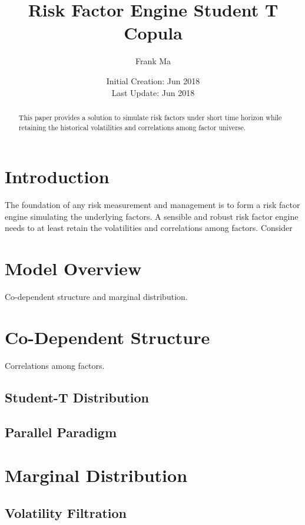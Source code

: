 \documentclass{article}
\title{Risk Factor Engine Student T Copula}
\author{Frank Ma}
\date{Initial Creation: Jun 2018 \\ Last Update: Jun 2018}
\begin{document}
\maketitle


\begin{abstract}
    This paper provides a solution to simulate risk factors under short time horizon while retaining the historical volatilities and correlations among factor universe.
\end{abstract}

\section{Introduction}
The foundation of any risk measurement and management is to form a risk factor engine simulating the underlying factors.
A sensible and robust risk factor engine needs to at least retain the volatilities and correlations among factors.
Consider 


\section{Model Overview}
Co-dependent structure and marginal distribution.


\section{Co-Dependent Structure}
Correlations among factors.


\subsection{Student-T Distribution}



\subsection{Parallel Paradigm}



\section{Marginal Distribution}



\subsection{Volatility Filtration}
\end{document}

